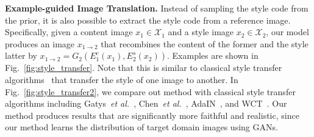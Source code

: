 \documentclass[runningheads]{llncs}
\newcommand{\vpara}[1]{\vspace{0.05in}\noindent\textbf{#1}}
\def\etal{\emph{et al.}\xspace}
\begin{document}
	
\vpara{Example-guided Image Translation.}  
Instead of sampling the style code from the prior, it is also possible to extract the style code from a reference image. Specifically, given a content image $x_{1}\in\mathcal{X}_{1}$ and a style image $x_{2}\in\mathcal{X}_{2}$, our model produces an image $x_{1\rightarrow 2}$ that recombines the content of the former and the style latter by $x_{1\rightarrow 2} = G_{2}(E^{c}_{1}(x_{1}), E^{s}_{2}(x_{2}))$.  Examples are shown in Fig.~\ref{fig:style_transfer}. 
Note that this is similar to classical style transfer algorithms~\cite{gatys2016image,hertzmann2001image,li2016combining,johnson2016perceptual,huang2017adain,li2017universal,li2018closed} that transfer the style of one image to another. 
In Fig.~\ref{fig:style_transfer2}, we compare out method with classical style transfer algorithms including Gatys~\etal~\cite{gatys2016image}, Chen~\etal~\cite{chen2016fast}, AdaIN~\cite{huang2017adain}, and WCT~\cite{li2017universal}. Our method produces results that are significantly more faithful and realistic, since our method learns the distribution of target domain images using GANs.
\end{document}
